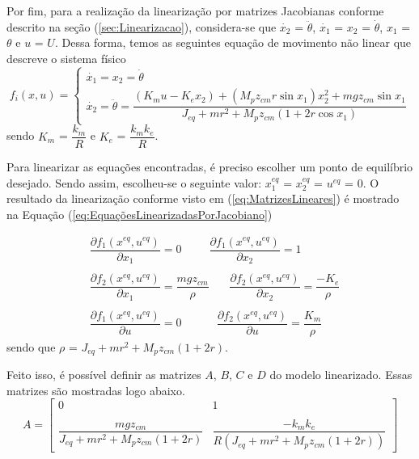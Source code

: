 Por fim, para a realização da linearização por matrizes Jacobianas conforme descrito na seção (\ref{sec:Linearizacao}), considera-se que $\dot{x_{2}}$ = $\ddot{\theta}$, $\dot{x_{1}}$ = $x_{2}$ = $\dot{\theta}$, $x_{1}$ = $\theta$ e $u$ = $U$. Dessa forma, temos as seguintes equação de movimento não linear que descreve o sistema físico
\begin{equation}
f_{i}(x,u) =
\begin{cases}
    \dot{x_{1}} = x_{2} = \dot{\theta} \\[6pt]
    \dot{x_{2}} = \ddot{\theta} = \dfrac{(K_{m}u - K_{e}x_{2}) + (M_{p}z_{cm}r\sin{x_{1}})x_{2}^2 + mgz_{cm}\sin{x_{1}}}{J_{eq} + mr^2 + M_{p}z_{cm}(1 + 2r\cos{x_{1}})}
\end{cases}
\end{equation}
sendo $K_{m}$ = $\dfrac{k_{m}}{R}$ e $K_{e}$ = $\dfrac{k_{m}k_{e}}{R}$. 
\newline

Para linearizar as equações encontradas, é preciso escolher um ponto de equilíbrio desejado. Sendo assim, escolheu-se o seguinte valor: $x_{1}^{eq}$ = $x_{2}^{eq}$ = $u^{eq}$ = 0. O resultado da linearização conforme visto em (\ref{eq:MatrizesLineares}) é mostrado na Equação (\ref{eq:EquaçõesLinearizadasPorJacobiano})

\begin{equation}\label{eq:EquaçõesLinearizadasPorJacobiano}
    \begin{array}{cc}
         &  \dfrac{\partial f_{1}(x^{eq},u^{eq})}{\partial x_{1}} = 0 ~~~~~~~~~~~        \dfrac{\partial f_{1}(x^{eq},u^{eq})}{\partial x_{2}} = 1 \\\\
             
         &  \dfrac{\partial f_{2}(x^{eq},u^{eq})}{\partial x_{1}} =    \dfrac{mgz_{cm}}{\rho} ~~~~~~~~
            \dfrac{\partial f_{2}(x^{eq},u^{eq})}{\partial x_{2}} = \dfrac{-K_{e}}{\rho} \\\\
        
        &   \dfrac{\partial f_{1}(x^{eq},u^{eq})}{\partial     u} = 0 ~~~~~~~~~~~~~~
            \dfrac{\partial f_{2}(x^{eq},u^{eq})}{\partial     u} = \dfrac{K_m}{\rho}
    \end{array}{}
\end{equation}
sendo que $\rho$ = $J_{eq} + mr^2 + M_{p}z_{cm}(1 + 2r)$.

Feito isso, é possível definir as matrizes $A$, $B$, $C$ e $D$ do modelo linearizado. Essas matrizes são mostradas logo abaixo.
\begin{equation*}
A = \begin{bmatrix}
        0 & 1 \\\\
        \dfrac{mgz_{cm}}{J_{eq} + mr^2 + M_{p}z_{cm}(1 + 2r)} & \dfrac{-k_{m}k_{e}}{R(J_{eq} + mr^2 + M_{p}z_{cm}(1 + 2r))}
    \end{bmatrix}
\end{equation*}

